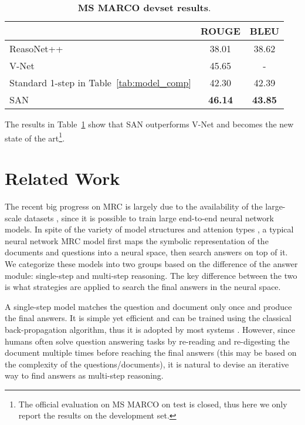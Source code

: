 \documentclass[11pt,a4paper]{article}
\begin{document}
\begin{table}[t!]
\centering
\begin{tabular}{@{\hskip1pt} l @{\hskip1pt} ||@{\hskip1pt} c @{\hskip1pt} | @{\hskip1pt} c }
\hline
	& ROUGE & BLEU \\ \hline\hline
ReasoNet++\cite{shen2017empirical} &38.01 & 38.62\\ \hline
V-Net\cite{multi-passage-mrc2018} & 45.65 & - \\ \hline \hline
Standard 1-step in Table~\ref{tab:model_comp}  &42.30 &42.39 \\ \hline 
SAN &\textbf{46.14} & \textbf{43.85} \\ \hline
\end{tabular}
\caption{\label{tab:comp_marco} 
\textbf{MS MARCO devset results}.} 
\end{table}



The results in Table~\ref{tab:comp_marco} show that SAN outperforms V-Net \cite{multi-passage-mrc2018} and becomes the new state of the art\footnote{The official evaluation on MS MARCO on test is closed, thus here we only report the results on the development set.}.










\section{Related Work}
The recent big progress on MRC is largely due to the availability of the large-scale datasets \cite{rajpurkar2016squad, nguyen2016ms, richardson13mctest, hill2015goldilocks}, since it is possible to train large end-to-end neural network models. 
In spite of the variety of model structures and attenion types \cite{bahdanau2014neural, chen2016thorough, xiong2016dynamic, seo2016bidirectional, shen2017empirical, wang2017gated}, a typical neural network MRC model first maps the symbolic representation of the documents and questions into a neural space, then search answers on top of it. We categorize these models into two groups based on the difference of the answer module: single-step and multi-step reasoning.
The key difference between the two is what strategies are applied to search the final answers in the neural space.

A single-step model matches the question and document only once and produce the final answers. It is simple yet efficient and can be trained using the classical back-propagation algorithm, thus it is adopted by most systems \cite{chen2016thorough, seo2016bidirectional, wang2017gated, liu2017phase, chen2017reading, weissenborn2017fastqa, hu2017mnemonic}. However, since humans often solve question answering tasks by re-reading and re-digesting the document multiple times before reaching the final answers (this may be based on the complexity of the questions/documents), it is natural to devise an iterative way to find answers as multi-step reasoning.
\end{document}

